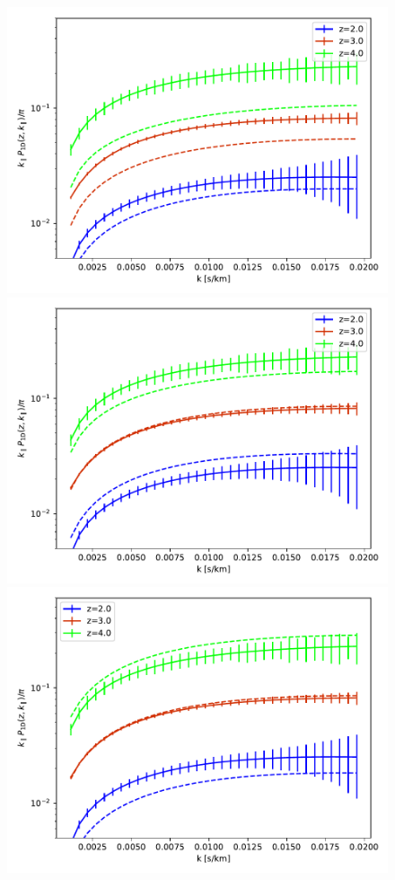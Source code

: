 \documentclass[]{article}
\begin{document}
\begin{figure}[h]
    \centering
    \includegraphics[scale=0.4]{Figures/random_likelihood.pdf}
    \includegraphics[scale=0.4]{Figures/amp_correct.pdf}
    \includegraphics[scale=0.4]{Figures/growth_too_high.pdf}

\end{figure}
\end{document}
